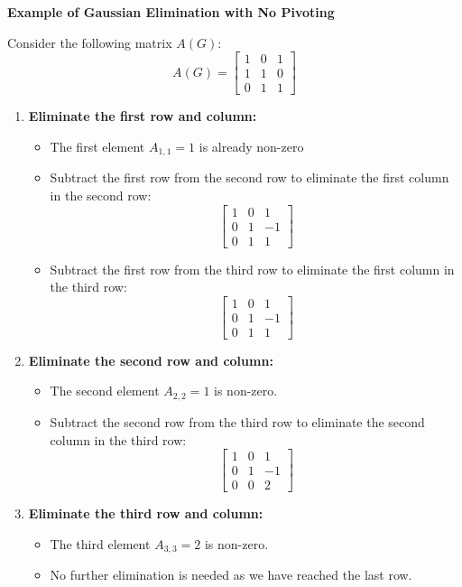 \textbf{Example of Gaussian Elimination with No Pivoting}

Consider the following matrix $A(G)$:
\[
A(G) = 
\begin{bmatrix} 
1 & 0 & 1 \\
1 & 1 & 0 \\
0 & 1 & 1
\end{bmatrix}
\]

\begin{enumerate} 
\item \textbf{Eliminate the first row and column:} 
    \begin{itemize}
        \item The first element \( A_{1,1} = 1 \) is already non-zero
         \item Subtract the first row from the second row to eliminate the first column in the second row:
        \[
        \begin{bmatrix} 
        1 & 0 & 1 \\
        0 & 1 & -1 \\
        0 & 1 & 1
        \end{bmatrix}
        \]
        \item Subtract the first row from the third row to eliminate the first column in the third row:
        \[
        \begin{bmatrix} 
        1 & 0 & 1 \\
        0 & 1 & -1 \\
        0 & 1 & 1
        \end{bmatrix}
        \]
    \end{itemize}

\item \textbf{Eliminate the second row and column:}
    \begin{itemize}
        \item The second element \( A_{2,2} = 1 \) is non-zero.
        \item Subtract the second row from the third row to eliminate the second column in the third row:
        \[
        \begin{bmatrix} 
        1 & 0 & 1 \\
        0 & 1 & -1 \\
        0 & 0 & 2
        \end{bmatrix}
        \]
    \end{itemize} 

\item \textbf{Eliminate the third row and column:}
    \begin{itemize}
        \item The third element \( A_{3,3} = 2 \) is non-zero.
        \item No further elimination is needed as we have reached the last row.
    \end{itemize}
\end{enumerate}

